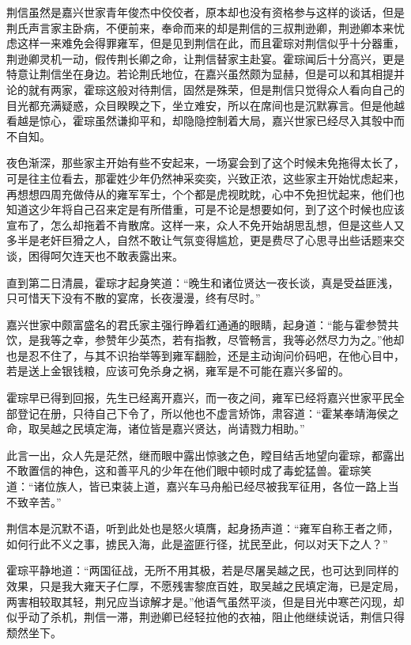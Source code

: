 荆信虽然是嘉兴世家青年俊杰中佼佼者，原本却也没有资格参与这样的谈话，但是荆氏声言家主卧病，不便前来，奉命而来的却是荆信的三叔荆逊卿，荆逊卿本来忧虑这样一来难免会得罪雍军，但是见到荆信在此，而且霍琮对荆信似乎十分器重，荆逊卿灵机一动，假传荆长卿之命，让荆信替家主赴宴。霍琮闻后十分高兴，更是特意让荆信坐在身边。若论荆氏地位，在嘉兴虽然颇为显赫，但是可以和其相提并论的就有两家，霍琮这般对待荆信，固然是殊荣，但是荆信只觉得众人看向自己的目光都充满疑惑，众目睽睽之下，坐立难安，所以在席间也是沉默寡言。但是他越看越是惊心，霍琮虽然谦抑平和，却隐隐控制着大局，嘉兴世家已经尽入其彀中而不自知。

夜色渐深，那些家主开始有些不安起来，一场宴会到了这个时候未免拖得太长了，可是往主位看去，那霍姓少年仍然神采奕奕，兴致正浓，这些家主开始忧虑起来，再想想四周充做侍从的雍军军士，个个都是虎视眈眈，心中不免担忧起来，他们也知道这少年将自己召来定是有所借重，可是不论是想要如何，到了这个时候也应该宣布了，怎么却拖着不肯散席。这样一来，众人不免开始胡思乱想，但是这些人又多半是老奸巨猾之人，自然不敢让气氛变得尴尬，更是费尽了心思寻出些话题来交谈，困得呵欠连天也不敢表露出来。

直到第二日清晨，霍琮才起身笑道：“晚生和诸位贤达一夜长谈，真是受益匪浅，只可惜天下没有不散的宴席，长夜漫漫，终有尽时。”

嘉兴世家中颇富盛名的君氏家主强行睁着红通通的眼睛，起身道：“能与霍参赞共饮，是我等之幸，参赞年少英杰，若有指教，尽管畅言，我等必然尽力为之。”他却也是忍不住了，与其不识抬举等到雍军翻脸，还是主动询问价码吧，在他心目中，若是送上金银钱粮，应该可免杀身之祸，雍军是不可能在嘉兴多留的。

霍琮早已得到回报，先生已经离开嘉兴，而一夜之间，雍军已经将嘉兴世家平民全部登记在册，只待自己下令了，所以他也不虚言矫饰，肃容道：“霍某奉靖海侯之命，取吴越之民填定海，诸位皆是嘉兴贤达，尚请戮力相助。”

此言一出，众人先是茫然，继而眼中露出惊骇之色，瞠目结舌地望向霍琮，都露出不敢置信的神色，这和善平凡的少年在他们眼中顿时成了毒蛇猛兽。霍琮笑道：“诸位族人，皆已束装上道，嘉兴车马舟船已经尽被我军征用，各位一路上当不致辛苦。”

荆信本是沉默不语，听到此处也是怒火填膺，起身扬声道：“雍军自称王者之师，如何行此不义之事，掳民入海，此是盗匪行径，扰民至此，何以对天下之人？”

霍琮平静地道：“两国征战，无所不用其极，若是尽屠吴越之民，也可达到同样的效果，只是我大雍天子仁厚，不愿残害黎庶百姓，取吴越之民填定海，已是定局，两害相较取其轻，荆兄应当谅解才是。”他语气虽然平淡，但是目光中寒芒闪现，却似乎动了杀机，荆信一滞，荆逊卿已经轻拉他的衣袖，阻止他继续说话，荆信只得颓然坐下。

